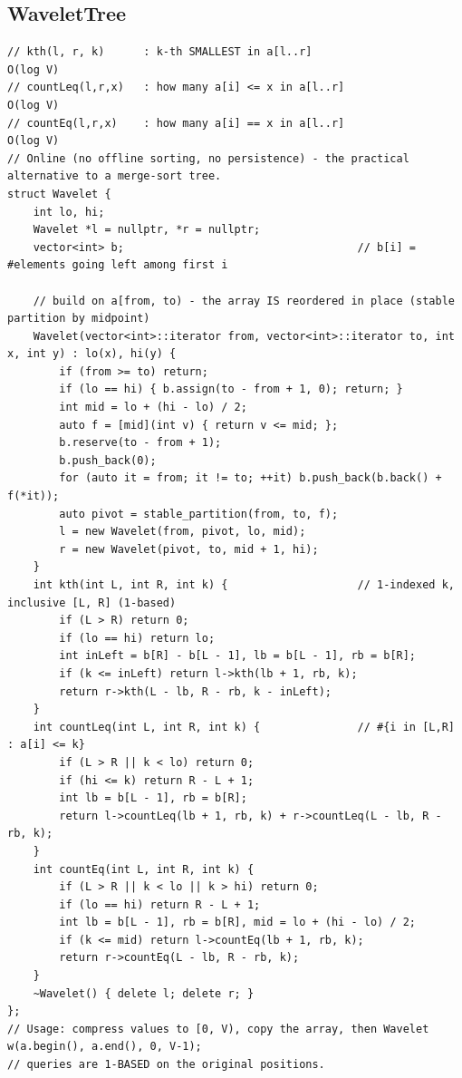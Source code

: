 \documentclass[9pt,a4paper,twocolumn]{extarticle}
\begin{document}
\subsection{WaveletTree}
\nopagebreak
\begin{lstlisting}
// kth(l, r, k)      : k-th SMALLEST in a[l..r]                       O(log V)
// countLeq(l,r,x)   : how many a[i] <= x in a[l..r]                  O(log V)
// countEq(l,r,x)    : how many a[i] == x in a[l..r]                  O(log V)
// Online (no offline sorting, no persistence) - the practical alternative to a merge-sort tree.
struct Wavelet {
    int lo, hi;
    Wavelet *l = nullptr, *r = nullptr;
    vector<int> b;                                    // b[i] = #elements going left among first i

    // build on a[from, to) - the array IS reordered in place (stable partition by midpoint)
    Wavelet(vector<int>::iterator from, vector<int>::iterator to, int x, int y) : lo(x), hi(y) {
        if (from >= to) return;
        if (lo == hi) { b.assign(to - from + 1, 0); return; }
        int mid = lo + (hi - lo) / 2;
        auto f = [mid](int v) { return v <= mid; };
        b.reserve(to - from + 1);
        b.push_back(0);
        for (auto it = from; it != to; ++it) b.push_back(b.back() + f(*it));
        auto pivot = stable_partition(from, to, f);
        l = new Wavelet(from, pivot, lo, mid);
        r = new Wavelet(pivot, to, mid + 1, hi);
    }
    int kth(int L, int R, int k) {                    // 1-indexed k, inclusive [L, R] (1-based)
        if (L > R) return 0;
        if (lo == hi) return lo;
        int inLeft = b[R] - b[L - 1], lb = b[L - 1], rb = b[R];
        if (k <= inLeft) return l->kth(lb + 1, rb, k);
        return r->kth(L - lb, R - rb, k - inLeft);
    }
    int countLeq(int L, int R, int k) {               // #{i in [L,R] : a[i] <= k}
        if (L > R || k < lo) return 0;
        if (hi <= k) return R - L + 1;
        int lb = b[L - 1], rb = b[R];
        return l->countLeq(lb + 1, rb, k) + r->countLeq(L - lb, R - rb, k);
    }
    int countEq(int L, int R, int k) {
        if (L > R || k < lo || k > hi) return 0;
        if (lo == hi) return R - L + 1;
        int lb = b[L - 1], rb = b[R], mid = lo + (hi - lo) / 2;
        if (k <= mid) return l->countEq(lb + 1, rb, k);
        return r->countEq(L - lb, R - rb, k);
    }
    ~Wavelet() { delete l; delete r; }
};
// Usage: compress values to [0, V), copy the array, then Wavelet w(a.begin(), a.end(), 0, V-1);
// queries are 1-BASED on the original positions.
\end{lstlisting}
\end{document}

